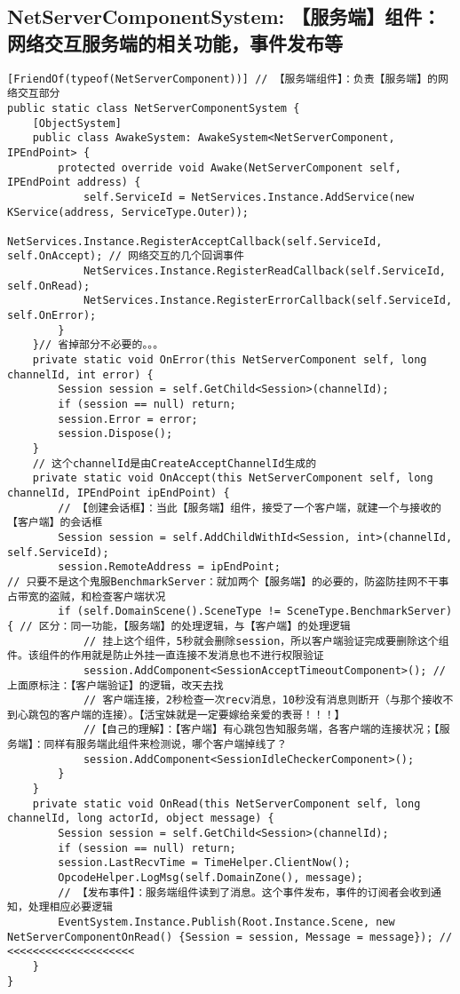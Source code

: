 \documentclass[9pt, b5paper]{article}
\begin{document}
\subsection{NetServerComponentSystem: 【服务端】组件：网络交互服务端的相关功能，事件发布等}
\label{sec-6-4}
\begin{verbatim}
[FriendOf(typeof(NetServerComponent))] // 【服务端组件】：负责【服务端】的网络交互部分
public static class NetServerComponentSystem {
    [ObjectSystem]
    public class AwakeSystem: AwakeSystem<NetServerComponent, IPEndPoint> {
        protected override void Awake(NetServerComponent self, IPEndPoint address) {
            self.ServiceId = NetServices.Instance.AddService(new KService(address, ServiceType.Outer));
            NetServices.Instance.RegisterAcceptCallback(self.ServiceId, self.OnAccept); // 网络交互的几个回调事件
            NetServices.Instance.RegisterReadCallback(self.ServiceId, self.OnRead);
            NetServices.Instance.RegisterErrorCallback(self.ServiceId, self.OnError);
        }
    }// 省掉部分不必要的。。。
    private static void OnError(this NetServerComponent self, long channelId, int error) {
        Session session = self.GetChild<Session>(channelId);
        if (session == null) return;
        session.Error = error;
        session.Dispose();
    }
    // 这个channelId是由CreateAcceptChannelId生成的
    private static void OnAccept(this NetServerComponent self, long channelId, IPEndPoint ipEndPoint) {
        // 【创建会话框】：当此【服务端】组件，接受了一个客户端，就建一个与接收的【客户端】的会话框
        Session session = self.AddChildWithId<Session, int>(channelId, self.ServiceId);
        session.RemoteAddress = ipEndPoint;
// 只要不是这个鬼服BenchmarkServer：就加两个【服务端】的必要的，防盗防挂网不干事占带宽的盗贼，和检查客户端状况
        if (self.DomainScene().SceneType != SceneType.BenchmarkServer) { // 区分：同一功能，【服务端】的处理逻辑，与【客户端】的处理逻辑 
            // 挂上这个组件，5秒就会删除session，所以客户端验证完成要删除这个组件。该组件的作用就是防止外挂一直连接不发消息也不进行权限验证
            session.AddComponent<SessionAcceptTimeoutComponent>(); // 上面原标注：【客户端验证】的逻辑，改天去找
            // 客户端连接，2秒检查一次recv消息，10秒没有消息则断开（与那个接收不到心跳包的客户端的连接）。【活宝妹就是一定要嫁给亲爱的表哥！！！】
            //【自己的理解】：【客户端】有心跳包告知服务端，各客户端的连接状况；【服务端】：同样有服务端此组件来检测说，哪个客户端掉线了？
            session.AddComponent<SessionIdleCheckerComponent>();
        }
    }
    private static void OnRead(this NetServerComponent self, long channelId, long actorId, object message) {
        Session session = self.GetChild<Session>(channelId);
        if (session == null) return;
        session.LastRecvTime = TimeHelper.ClientNow();
        OpcodeHelper.LogMsg(self.DomainZone(), message);
        // 【发布事件】：服务端组件读到了消息。这个事件发布，事件的订阅者会收到通知，处理相应必要逻辑
        EventSystem.Instance.Publish(Root.Instance.Scene, new NetServerComponentOnRead() {Session = session, Message = message}); // <<<<<<<<<<<<<<<<<<<< 
    }
}
\end{verbatim}
\end{document}
